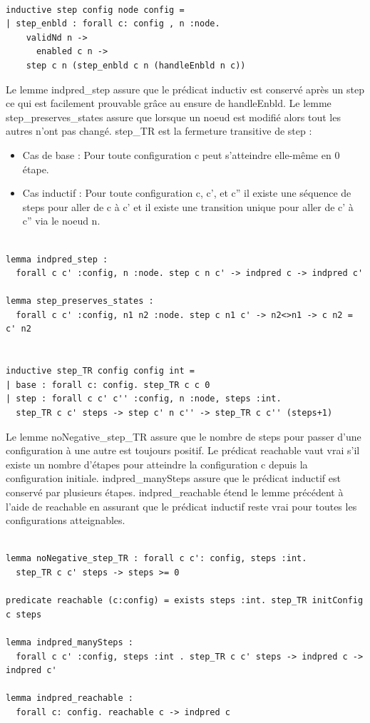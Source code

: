 \documentclass[11pt]{article}
\begin{document}
\lstset{language=why3,label= ,caption= ,captionpos=b,numbers=none}
\begin{lstlisting}

inductive step config node config =
| step_enbld : forall c: config , n :node.
    validNd n ->
      enabled c n ->
	step c n (step_enbld c n (handleEnbld n c))

\end{lstlisting}
Le lemme indpred\_step assure que le prédicat inductiv est conservé après un step ce qui est facilement prouvable grâce au ensure de handleEnbld.
Le lemme step\_preserves\_states assure que lorsque un noeud est modifié alors tout les autres n'ont pas changé. 
step\_TR est la fermeture transitive de step : 
\begin{itemize}
\item Cas de base : Pour toute configuration c peut s'atteindre elle-même en 0 étape.
\item Cas inductif : Pour toute configuration c, c', et c'' il existe une séquence de steps pour aller de c à c' et il existe une transition unique pour aller de c' à c'' via le noeud n.
\end{itemize}
\lstset{language=why3,label= ,caption= ,captionpos=b,numbers=none}
\begin{lstlisting}

lemma indpred_step :
  forall c c' :config, n :node. step c n c' -> indpred c -> indpred c'

lemma step_preserves_states :
  forall c c' :config, n1 n2 :node. step c n1 c' -> n2<>n1 -> c n2 = c' n2


inductive step_TR config config int =
| base : forall c: config. step_TR c c 0
| step : forall c c' c'' :config, n :node, steps :int.
  step_TR c c' steps -> step c' n c'' -> step_TR c c'' (steps+1)

\end{lstlisting}
Le lemme noNegative\_step\_TR assure que le nombre de steps pour passer d'une configuration à une autre est toujours positif.
Le prédicat reachable vaut vrai s'il existe un nombre d'étapes pour atteindre la configuration c depuis la configuration initiale.
indpred\_manySteps assure que le prédicat inductif est conservé par plusieurs étapes.
indpred\_reachable étend le lemme précédent à l'aide de reachable en assurant que le prédicat inductif reste vrai pour toutes les configurations atteignables. 
\lstset{language=why3,label= ,caption= ,captionpos=b,numbers=none}
\begin{lstlisting}

lemma noNegative_step_TR : forall c c': config, steps :int.
  step_TR c c' steps -> steps >= 0

predicate reachable (c:config) = exists steps :int. step_TR initConfig c steps

lemma indpred_manySteps :
  forall c c' :config, steps :int . step_TR c c' steps -> indpred c -> indpred c'

lemma indpred_reachable :
  forall c: config. reachable c -> indpred c

\end{lstlisting}
\end{document}
